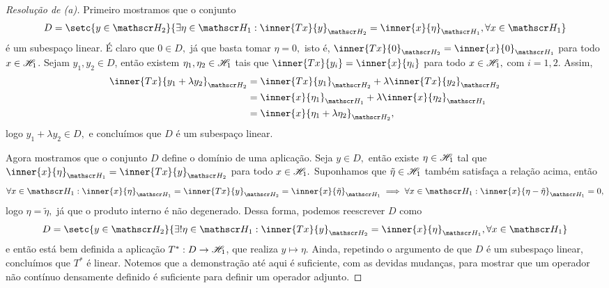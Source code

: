 \begin{proof}[Resolução de (a)]
  Primeiro mostramos que o conjunto
  \begin{equation*}
    D = \setc{y \in \hilbert_2}{\exists \eta \in \hilbert_1 : \inner{Tx}{y}_{\hilbert_2} = \inner{x}{\eta}_{\hilbert_1}, \forall x \in \hilbert_1}
  \end{equation*}
  é um subespaço linear. É claro que \(0 \in D,\) já que basta tomar \(\eta = 0,\) isto é, \(\inner{Tx}{0}_{\hilbert_2} = \inner{x}{0}_{\hilbert_1}\) para todo \(x \in \mathscr{H}_1\). Sejam \(y_1, y_2 \in D\), então existem \(\eta_1,\eta_2 \in \mathscr{H}_1\) tais que \(\inner{Tx}{y_i} = \inner{x}{\eta_i}\) para todo \(x \in \mathscr{H}_1,\) com \(i = 1, 2.\) Assim,
  \begin{align*}
    \inner{Tx}{y_1 + \lambda y_2}_{\hilbert_2} &= \inner{Tx}{y_1}_{\hilbert_2} + \lambda \inner{Tx}{y_2}_{\hilbert_2}
                                             \\&= \inner{x}{\eta_1}_{\hilbert_1} + \lambda \inner{x}{\eta_2}_{\hilbert_1}
                                             \\&= \inner{x}{\eta_1 + \lambda \eta_2}_{\hilbert_2},
  \end{align*}
  logo \(y_1 + \lambda y_2 \in D,\) e concluímos que \(D\) é um subespaço linear.

  Agora mostramos que o conjunto \(D\) define o domínio de uma aplicação. Seja \(y \in D,\) então existe \(\eta \in \mathscr{H}_1\) tal que \(\inner{x}{\eta}_{\hilbert_1} = \inner{Tx}{y}_{\hilbert_2}\) para todo \(x \in \mathscr{H}_1.\) Suponhamos que \(\tilde{\eta} \in \mathscr{H}_1\) também satisfaça a relação acima, então
  \begin{equation*}
    \forall x \in \hilbert_1 : \inner{x}{\eta}_{\hilbert_1} = \inner{Tx}{y}_{\hilbert_2} = \inner{x}{\tilde{\eta}}_{\hilbert_1} \implies \forall x \in \hilbert_1 : \inner{x}{\eta - \tilde{\eta}}_{\hilbert_1} = 0,
  \end{equation*}
  logo \(\eta = \tilde{\eta},\) já que o produto interno é não degenerado. Dessa forma, podemos reescrever \(D\) como
  \begin{equation*}
    D = \setc{y \in \hilbert_2}{\exists! \eta \in \hilbert_1 : \inner{Tx}{y}_{\hilbert_2} = \inner{x}{\eta}_{\hilbert_1}, \forall x \in \hilbert_1}
  \end{equation*}
  e então está bem definida a aplicação \(T^* : D \to \mathscr{H}_1\), que realiza \(y \mapsto \eta.\) Ainda, repetindo o argumento de que \(D\) é um subespaço linear, concluímos que \(T^*\) é linear. Notemos que a demonstração até aqui é suficiente, com as devidas mudanças, para mostrar que um operador não contínuo densamente definido é suficiente para definir um operador adjunto.


\end{proof}

